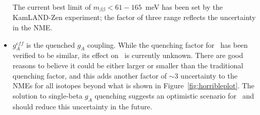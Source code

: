 \documentclass[/main.tex]{subfiles}
\begin{document}
\begin{itemize}
  The current best limit of $m_{\beta\beta}<61-165$~meV has been set by the KamLAND-Zen experiment\cite{kamlandzen}; the factor of three range reflects the uncertainty in the NME. 
\item $g^{eff}_A$ is the quenched $g_A$ coupling.
  While the quenching factor for \tnbb\ has been verified to be similar, its effect on \znbb\ is currently unknown.
  There are good reasons to believe it could be either larger or smaller than the traditional quenching factor, and this adds another factor of ${\sim}3$ uncertainty to the NMEs for all isotopes beyond what is shown in Figure~\ref{fig:horribleplot}\cite{Engel2017}.
  The solution to single-beta $g_A$ quenching suggests an optimistic scenario for \znbb\ and should reduce this uncertainty in the future.
\end{itemize}
\end{document}
